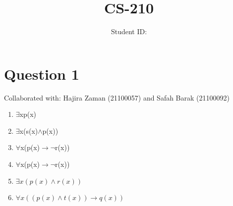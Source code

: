 \documentclass{article}
\title{CS-210 \hwNo}
\author{\myname \qquad Student ID: \myid}
\begin{document}
\maketitle

\section{Question 1}
Collaborated with: Hajira Zaman (21100057) and Safah Barak (21100092)
\begin{enumerate}
\item %
$\exists$xp(x)

\item %
$\exists$x(s(x)$\wedge$p(x))

\item %
$\forall$x(p(x)$\rightarrow$$\lnot$r(x))
\item %
$\forall$x(p(x)$\rightarrow$$\lnot$r(x))
\item %
$\exists x(p(x)\wedge r(x))$
\item %
$\forall x((p(x)\wedge t(x))\rightarrow q(x))$
\end{enumerate}
\end{document}

